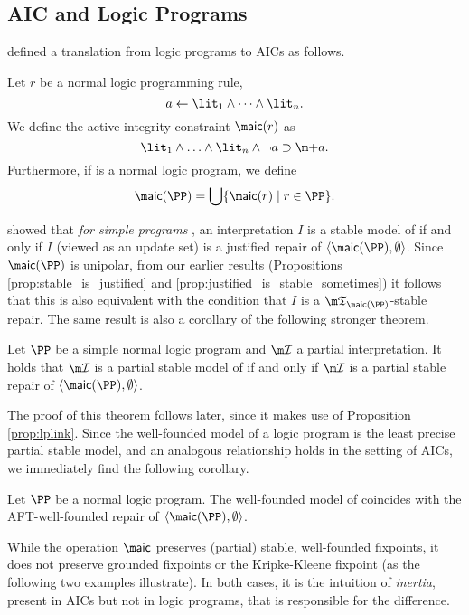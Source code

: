 \subsection{AIC and Logic Programs}
\citet{tplp/CaropreseT11} defined a translation from logic programs to AICs as follows. 
\begin{definition}
  \label{defn:aic-transf}
 Let $r$ be a normal logic programming rule, 
 \[a\leftarrow \lit_1  \land \dots \land \lit_n.\]
 We define the active integrity constraint $\aicop (r)$ as 
 \[\lit_1\wedge\ldots\wedge\lit_n\wedge\neg a \aicrule \add a.\]
 Furthermore, if \PP is a normal logic program, we define 
 \[\aicop(\PP)=\bigcup\{\aicop(r)\mid r\in \PP\}.\]
\end{definition}

\citet{tplp/CaropreseT11} showed that \emph{for simple programs \PP}, an interpretation $I$ is a stable model of \PP if and only if $I$ (viewed as an update set) is a justified repair of $\langle\aicop(\PP),\emptyset\rangle$. Since $\aicop(\PP)$ is unipolar, from our earlier results (Propositions \ref{prop:stable_is_justified} and \ref{prop:justified_is_stable_sometimes}) it follows that this is also equivalent with the condition that $I$ is a $\threeap_{\aicop(\PP)}$-stable repair. 
The same result is also a corollary of the following stronger theorem. 
\begin{theorem}\label{thm:partialstable-LP}
 Let $\PP$ be a simple normal logic program and $\pstruct$ a partial interpretation. It holds that $\pstruct$ is a partial stable model of \PP if and only if $\pstruct$ is a partial stable repair of $\langle \aicop(\PP),\emptyset\rangle$. 
\end{theorem}
The proof of this theorem follows later, since it makes use of Proposition \ref{prop:lplink}. 
Since the well-founded model of a logic program is the least precise partial stable model, and an analogous relationship holds in the setting of AICs, we immediately find the following corollary. 

\begin{corollary}
 Let $\PP$ be a normal logic program. The well-founded model of \PP coincides with the AFT-well-founded repair of $\langle \aicop(\PP),\emptyset\rangle$. 
\end{corollary}

 While the operation $\aicop$ preserves (partial) stable, well-founded  fixpoints, it does not preserve grounded fixpoints or the Kripke-Kleene fixpoint (as the following two examples illustrate). In both cases, it is the intuition of \emph{inertia}, present in AICs but not in logic programs, that is responsible for the difference. 

